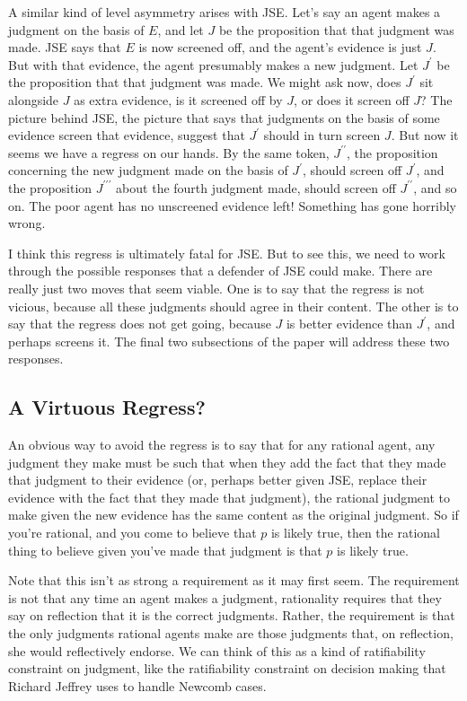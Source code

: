 A similar kind of level asymmetry arises with JSE. Let's say an agent makes a judgment on the basis of \(E\), and let \(J\) be the proposition that that judgment was made. JSE says that \(E\) is now screened off, and the agent's evidence is just \(J\). But with that evidence, the agent presumably makes a new judgment. Let \(J^\prime\) be the proposition that that judgment was made. We might ask now, does \(J^\prime\) sit alongside \(J\) as extra evidence, is it screened off by \(J\), or does it screen off \(J\)? The picture behind JSE, the picture that says that judgments on the basis of some evidence screen that evidence, suggest that \(J^\prime\) should in turn screen \(J\). But now it seems we have a regress on our hands. By the same token, \(J^{\prime \prime}\), the proposition concerning the new judgment made on the basis of \(J^\prime\), should screen off \(J^\prime\), and the proposition \(J^{\prime \prime \prime}\) about the fourth judgment made, should screen off \(J^{\prime \prime}\), and so on. The poor agent has no unscreened evidence left! Something has gone horribly wrong.

I think this regress is ultimately fatal for JSE. But to see this, we need to work through the possible responses that a defender of JSE could make. There are really just two moves that seem viable. One is to say that the regress is not vicious, because all these judgments should agree in their content. The other is to say that the regress does not get going, because \(J\) is better evidence than \(J^\prime\), and perhaps screens it. The final two subsections of the paper will address these two responses.

\subsection{A Virtuous Regress?}

An obvious way to avoid the regress is to say that for any rational agent, any judgment they make must be such that when they add the fact that they made that judgment to their evidence (or, perhaps better given JSE, replace their evidence with the fact that they made that judgment), the rational judgment to make given the new evidence has the same content as the original judgment. So if you're rational, and you come to believe that \(p\) is likely true, then the rational thing to believe given you've made that judgment is that \(p\) is likely true.

Note that this isn't as strong a requirement as it may first seem. The requirement is not that any time an agent makes a judgment, rationality requires that they say on reflection that it is the correct judgments. Rather, the requirement is that the only judgments rational agents make are those judgments that, on reflection, she would reflectively endorse. We can think of this as a kind of ratifiability constraint on judgment, like the ratifiability constraint on decision making that Richard Jeffrey uses to handle Newcomb cases. 

